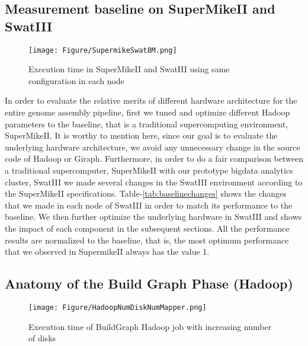 \subsection {Measurement baseline on SuperMikeII and SwatIII}
\begin{figure}[h!]
\label {fig:Baseline8M}
  \centering
      \texttt{[image: Figure/SupermikeSwat8M.png]}
  \caption{Execution time in SuperMikeII and SwatIII using same configuration in each node}
\end{figure}
In order to evaluate the relative merits of different hardware architecture for the entire genome assembly pipeline, first we tuned and optimize different Hadoop parameters to the baseline, that is a traditional supercomputing environment, SuperMikeII.
It is worthy to mention here, since our goal is to evaluate the underlying hardware architecture, we avoid any unnecessary change in the source code of Hadoop or Giraph.
Furthermore, in order to do a fair comparison between a traditional supercomputer, SuperMikeII with our prototype bigdata analytics cluster, SwatIII we made several changes in the SwatIII environment according to the SuperMikeII specifications.
Table-\ref{tab:baselinechanges} shows the changes that we made in each node of SwatIII in order to match its performance to the baseline.
We then further optimize the underlying hardware in SwatIII and shows the impact of each component in the subsequent sections.
All the performance results are normalized to the baseline, that is, the most optimum performance that we observed in SupermikeII always has the value 1. 

\subsection {Anatomy of the Build Graph Phase (Hadoop)}
\begin{figure}[h!]
\label {fig:EffectHadoop}
  \centering
      \texttt{[image: Figure/HadoopNumDiskNumMapper.png]}
  \caption{Execution time of BuildGraph Hadoop job with increasing number of disks}
\end{figure}

